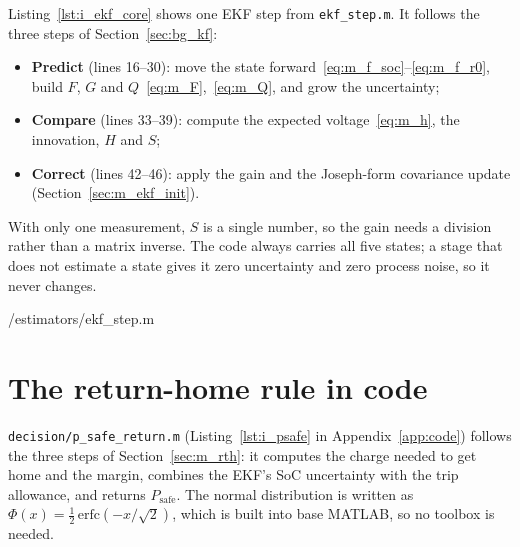 Listing~\ref{lst:i_ekf_core} shows one EKF step from \texttt{ekf\_step.m}. It follows the three steps of Section~\ref{sec:bg_kf}:
\begin{itemize}
  \item \textbf{Predict} (lines 16--30): move the state forward~\eqref{eq:m_f_soc}--\eqref{eq:m_f_r0}, build $F$, $G$ and $Q$~\eqref{eq:m_F},~\eqref{eq:m_Q}, and grow the uncertainty;
  \item \textbf{Compare} (lines 33--39): compute the expected voltage~\eqref{eq:m_h}, the innovation, $H$ and $S$;
  \item \textbf{Correct} (lines 42--46): apply the gain and the Joseph-form covariance update (Section~\ref{sec:m_ekf_init}).
\end{itemize}
With only one measurement, $S$ is a single number, so the gain needs a division rather than a matrix inverse. The code always carries all five states; a stage that does not estimate a state gives it zero uncertainty and zero process noise, so it never changes.


  {\codedir/estimators/ekf_step.m}

\section{The return-home rule in code}\label{sec:i_decision}

\texttt{decision/p\_safe\_return.m} (Listing~\ref{lst:i_psafe} in Appendix~\ref{app:code}) follows the three steps of Section~\ref{sec:m_rth}: it computes the charge needed to get home and the margin, combines the EKF's SoC uncertainty with the trip allowance, and returns $P_{\text{safe}}$. The normal distribution is written as $\Phi(x) = \tfrac{1}{2}\,\mathrm{erfc}(-x/\sqrt{2})$, which is built into base MATLAB, so no toolbox is needed.
